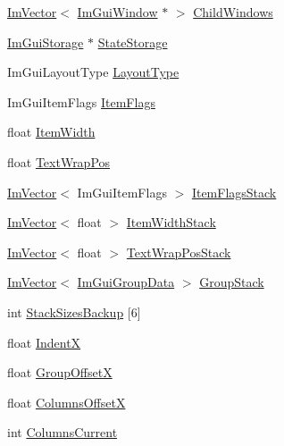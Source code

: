 \begin{DoxyCompactItemize}
\item 
\hyperlink{class_im_vector}{Im\+Vector}$<$ \hyperlink{struct_im_gui_window}{Im\+Gui\+Window} $\ast$ $>$ \hyperlink{struct_im_gui_draw_context_a70dc80b69c2a4e5fae4009300fe525a5}{Child\+Windows}
\item 
\hyperlink{struct_im_gui_storage}{Im\+Gui\+Storage} $\ast$ \hyperlink{struct_im_gui_draw_context_a507947c789f377ba13767061557fd348}{State\+Storage}
\item 
Im\+Gui\+Layout\+Type \hyperlink{struct_im_gui_draw_context_a8516b32e30504c3037d34e93b7988d83}{Layout\+Type}
\item 
Im\+Gui\+Item\+Flags \hyperlink{struct_im_gui_draw_context_a8581650b6011e19f09b12b8bc50a51f5}{Item\+Flags}
\item 
float \hyperlink{struct_im_gui_draw_context_a6327a65273ded49b6aa309167fca4b9e}{Item\+Width}
\item 
float \hyperlink{struct_im_gui_draw_context_a0488b6a84b2f26ddd536fef2ae3f96c3}{Text\+Wrap\+Pos}
\item 
\hyperlink{class_im_vector}{Im\+Vector}$<$ Im\+Gui\+Item\+Flags $>$ \hyperlink{struct_im_gui_draw_context_a895d75185a81dc21bb6153090ab5b018}{Item\+Flags\+Stack}
\item 
\hyperlink{class_im_vector}{Im\+Vector}$<$ float $>$ \hyperlink{struct_im_gui_draw_context_af6420717337b44394ad7ccbe55446db2}{Item\+Width\+Stack}
\item 
\hyperlink{class_im_vector}{Im\+Vector}$<$ float $>$ \hyperlink{struct_im_gui_draw_context_ac282b2f910a8846f4c200c358974b12a}{Text\+Wrap\+Pos\+Stack}
\item 
\hyperlink{class_im_vector}{Im\+Vector}$<$ \hyperlink{struct_im_gui_group_data}{Im\+Gui\+Group\+Data} $>$ \hyperlink{struct_im_gui_draw_context_aa775f16a46bdfe8e131e25cab733afe0}{Group\+Stack}
\item 
int \hyperlink{struct_im_gui_draw_context_aedfc8e281f1d72c7c1882c36bebb00d1}{Stack\+Sizes\+Backup} \mbox{[}6\mbox{]}
\item 
float \hyperlink{struct_im_gui_draw_context_a3697085dca9164ca840d1fb1d52c8a66}{IndentX}
\item 
float \hyperlink{struct_im_gui_draw_context_a30473e3e4b3eeba6c8d1acdaaedecba9}{Group\+OffsetX}
\item 
float \hyperlink{struct_im_gui_draw_context_af8be098e7ddd1885343725f3fd61ce4a}{Columns\+OffsetX}
\item 
int \hyperlink{struct_im_gui_draw_context_aeeac02b1b1dd8e02e017befff8cf9e34}{Columns\+Current}
\item 

\end{DoxyCompactItemize}
